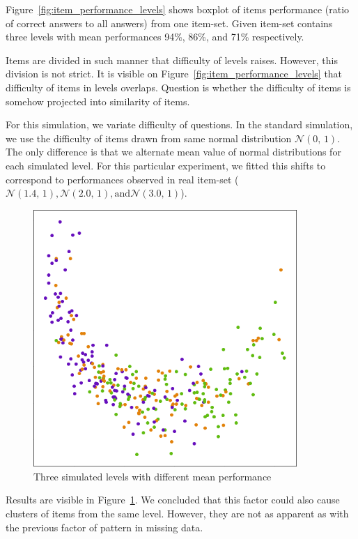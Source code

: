 \documentclass[
  printed, %
  table,   %
  nolof,     %
  nolot,     %
  color,
  final,
  nocover
]{fithesis3}
\begin{document}
Figure~\ref{fig:item_performance_levels} shows boxplot of items performance (ratio of correct answers to all answers) from one item-set. Given item-set contains three levels with mean performances 94\%, 86\%, and 71\% respectively.

Items are divided in such manner that difficulty of levels raises. However, this division is not strict. It is visible on Figure~\ref{fig:item_performance_levels} that difficulty of items in levels overlaps. Question is whether the difficulty of items is somehow projected into similarity of items.

For this simulation, we variate difficulty of questions. In the standard simulation, we use the difficulty of items drawn from same normal distribution $\mathcal{N}(0,\,1)$. The only difference is that we alternate mean value of normal distributions for each simulated level. For this particular experiment, we fitted this shifts to correspond to performances observed in real item-set ($\mathcal{N}(1.4,\,1), \mathcal{N}(2.0,\,1), \text{and} \mathcal{N}(3.0,\,1)$).

\begin{figure}
  \includegraphics[width=10cm]{img/simulated_performance}
  \caption{Three simulated levels with different mean performance}
  \label{fig:simulated_performance}
\end{figure}


Results are visible in Figure~\ref{fig:simulated_performance}. We concluded that this factor could also cause clusters of items from the same level. However, they are not as apparent as with the previous factor of pattern in missing data.
\end{document}

